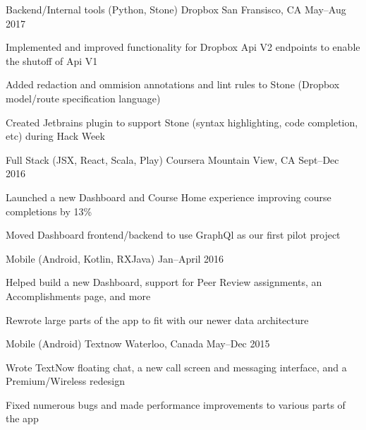 \begin{cventries}
  \cventry
    {Backend/Internal tools (Python, Stone)}
    {Dropbox}
    {San Fransisco, CA}
    {May--Aug 2017}
    {
      \begin{cvitems}
        \item {Implemented and improved functionality for Dropbox Api V2 endpoints to enable the shutoff of Api V1}
        \item {Added redaction and ommision annotations and lint rules to Stone (Dropbox model/route specification language)}
        \item {Created Jetbrains plugin to support Stone (syntax highlighting, code completion, etc) during Hack Week}
      \end{cvitems}
    }

  \cventry
    {Full Stack (JSX, React, Scala, Play)}
    {Coursera}
    {Mountain View, CA}
    {Sept--Dec 2016}
    {
      \begin{cvitems}
        \item {Launched a new Dashboard and Course Home experience improving course completions by 13\%}
        \item {Moved Dashboard frontend/backend to use GraphQl as our first pilot project}
      \end{cvitems}
    }

  \cventry
    {Mobile (Android, Kotlin, RXJava)}
    {}
    {}
    {Jan--April 2016}
    {
      \begin{cvitems}
        \item {Helped build a new Dashboard, support for Peer Review assignments, an Accomplishments page, and more}
        \item {Rewrote large parts of the app to fit with our newer data architecture}
      \end{cvitems}
    }

  \cventry
    {Mobile (Android)}
    {Textnow}
    {Waterloo, Canada}
    {May--Dec 2015}
    {
      \begin{cvitems}
        \item {Wrote TextNow floating chat, a new call screen and messaging interface, and a Premium/Wireless redesign}
        \item {Fixed numerous bugs and made performance improvements to various parts of the app}
      \end{cvitems}
    }


\end{cventries}
